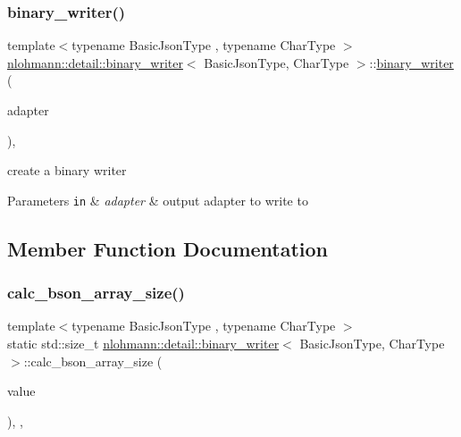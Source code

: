 \subsubsection{\texorpdfstring{binary\+\_\+writer()}{binary\_writer()}}
{\footnotesize\ttfamily template$<$typename Basic\+Json\+Type , typename Char\+Type $>$ \\
\mbox{\hyperlink{classnlohmann_1_1detail_1_1binary__writer}{nlohmann\+::detail\+::binary\+\_\+writer}}$<$ Basic\+Json\+Type, Char\+Type $>$\+::\mbox{\hyperlink{classnlohmann_1_1detail_1_1binary__writer}{binary\+\_\+writer}} (\begin{DoxyParamCaption}\item[{\mbox{\hyperlink{namespacenlohmann_1_1detail_a9b680ddfb58f27eb53a67229447fc556}{output\+\_\+adapter\+\_\+t}}$<$ Char\+Type $>$}]{adapter }\end{DoxyParamCaption})\hspace{0.3cm}{\ttfamily [inline]}, {\ttfamily [explicit]}}



create a binary writer 


\begin{DoxyParams}[1]{Parameters}
\mbox{\tt in}  & {\em adapter} & output adapter to write to \\
\hline
\end{DoxyParams}


\subsection{Member Function Documentation}
\mbox{\label{classnlohmann_1_1detail_1_1binary__writer_af08f9302a02516ff8cf358a99aaa1ddf}} 
\subsubsection{\texorpdfstring{calc\+\_\+bson\+\_\+array\+\_\+size()}{calc\_bson\_array\_size()}}
{\footnotesize\ttfamily template$<$typename Basic\+Json\+Type , typename Char\+Type $>$ \\
static std\+::size\+\_\+t \mbox{\hyperlink{classnlohmann_1_1detail_1_1binary__writer}{nlohmann\+::detail\+::binary\+\_\+writer}}$<$ Basic\+Json\+Type, Char\+Type $>$\+::calc\+\_\+bson\+\_\+array\+\_\+size (\begin{DoxyParamCaption}\item[{const typename Basic\+Json\+Type\+::array\+\_\+t \&}]{value }\end{DoxyParamCaption})\hspace{0.3cm}{\ttfamily [inline]}, {\ttfamily [static]}, {\ttfamily [private]}}

